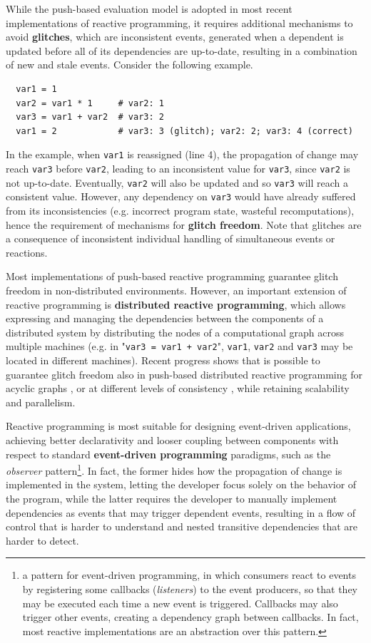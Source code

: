 While the push-based evaluation model is adopted in most recent implementations
of reactive programming, it requires additional mechanisms to avoid
\textbf{glitches}, which are inconsistent events, generated when a dependent is
updated before all of its dependencies are up-to-date, resulting in a
combination of new and stale events. Consider the following example.

\begin{lstlisting}
  var1 = 1
  var2 = var1 * 1     # var2: 1
  var3 = var1 + var2  # var3: 2
  var1 = 2            # var3: 3 (glitch); var2: 2; var3: 4 (correct)
\end{lstlisting}

In the example, when \texttt{var1} is reassigned (line 4), the propagation of
change may reach \texttt{var3} before \texttt{var2}, leading to an inconsistent
value for \texttt{var3}, since \texttt{var2} is not up-to-date. Eventually,
\texttt{var2} will also be updated and so \texttt{var3} will reach a consistent
value. However, any dependency on \texttt{var3} would have already suffered
from its inconsistencies (e.g. incorrect program state, wasteful
recomputations), hence the requirement of mechanisms for \textbf{glitch
freedom}. Note that glitches are a consequence of inconsistent individual
handling of simultaneous events or reactions.

Most implementations of push-based reactive programming guarantee glitch
freedom in non-distributed environments. However, an important extension of
reactive programming is \textbf{distributed reactive programming}, which allows
expressing and managing the dependencies between the components of a
distributed system by distributing the nodes of a computational graph across
multiple machines (e.g. in "\texttt{var3 = var1 + var2}", \texttt{var1},
\texttt{var2} and \texttt{var3} may be located in different machines). Recent
progress shows that is possible to guarantee glitch freedom also in push-based
distributed reactive programming for acyclic graphs \cite{QPROP}, or at
different levels of consistency \cite{DREAM}, while retaining scalability and
parallelism.

Reactive programming is most suitable for designing event-driven applications,
achieving better declarativity and looser coupling between components with
respect to standard \textbf{event-driven programming} paradigms, such as the
\textit{observer} pattern\footnote{a pattern for event-driven programming, in
which consumers react to events by registering some callbacks
(\textit{listeners}) to the event producers, so that they may be executed each
time a new event is triggered. Callbacks may also trigger other events,
creating a dependency graph between callbacks. In fact, most reactive
implementations are an abstraction over this pattern.}. In fact, the former
hides how the propagation of change is implemented in the system, letting the
developer focus solely on the behavior of the program, while the latter
requires the developer to manually implement dependencies as events that may
trigger dependent events, resulting in a flow of control that is harder to
understand and nested transitive dependencies that are harder to detect.
